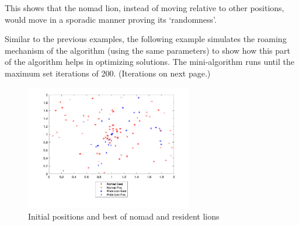 This shows that the nomad lion, instead of moving relative to other positions, would move in a sporadic manner proving its `randomness'.

Similar to the previous examples, the following example simulates the roaming mechanism of the algorithm (using the same parameters) to show how this part of the algorithm helps in optimizing solutions. The mini-algorithm runs until the maximum set iterations of 200. (Iterations on next page.)

\begin{figure}[h]
\begin{center}
\includegraphics[width=0.65\textwidth]{img/roam/roam-init}
\caption{Initial positions and best of nomad and resident lions}
\end{center}
\end{figure}

